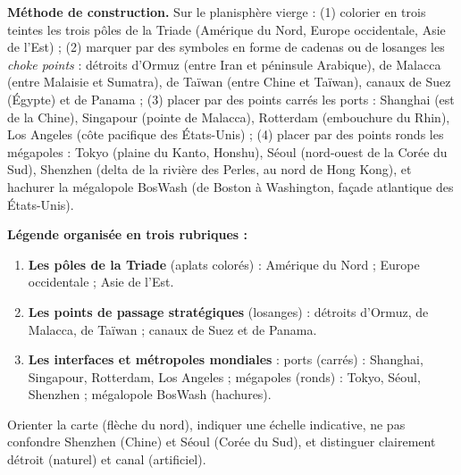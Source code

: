 \documentclass[11pt]{article}
\begin{document}
\begin{corrige}
\textbf{Méthode de construction.} Sur le planisphère vierge : (1) colorier en trois teintes les trois pôles de la Triade (Amérique du Nord, Europe occidentale, Asie de l'Est) ; (2) marquer par des symboles en forme de cadenas ou de losanges les \emph{choke points} : détroits d'Ormuz (entre Iran et péninsule Arabique), de Malacca (entre Malaisie et Sumatra), de Taïwan (entre Chine et Taïwan), canaux de Suez (Égypte) et de Panama ; (3) placer par des points carrés les ports : Shanghai (est de la Chine), Singapour (pointe de Malacca), Rotterdam (embouchure du Rhin), Los Angeles (côte pacifique des États-Unis) ; (4) placer par des points ronds les mégapoles : Tokyo (plaine du Kanto, Honshu), Séoul (nord-ouest de la Corée du Sud), Shenzhen (delta de la rivière des Perles, au nord de Hong Kong), et hachurer la mégalopole BosWash (de Boston à Washington, façade atlantique des États-Unis).

\textbf{Légende organisée en trois rubriques :}
\begin{enumerate}
\item \textbf{Les pôles de la Triade} (aplats colorés) : Amérique du Nord ; Europe occidentale ; Asie de l'Est.
\item \textbf{Les points de passage stratégiques} (losanges) : détroits d'Ormuz, de Malacca, de Taïwan ; canaux de Suez et de Panama.
\item \textbf{Les interfaces et métropoles mondiales} : ports (carrés) : Shanghai, Singapour, Rotterdam, Los Angeles ; mégapoles (ronds) : Tokyo, Séoul, Shenzhen ; mégalopole BosWash (hachures).
\end{enumerate}
\begin{attention}
Orienter la carte (flèche du nord), indiquer une échelle indicative, ne pas confondre Shenzhen (Chine) et Séoul (Corée du Sud), et distinguer clairement détroit (naturel) et canal (artificiel).
\end{attention}
\end{corrige}
\end{document}

